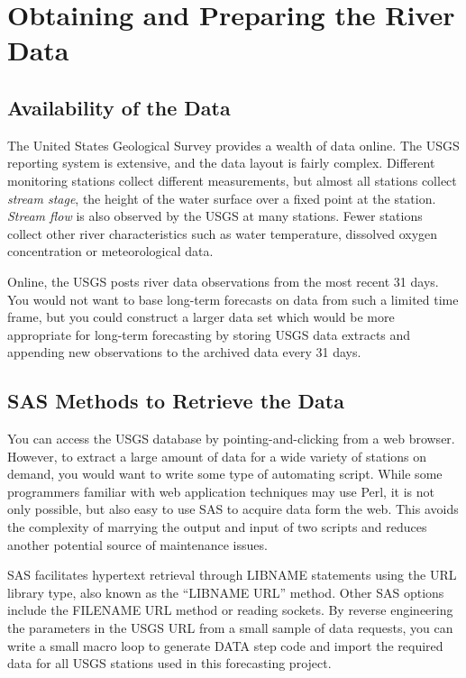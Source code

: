\documentclass[10pt]{sugconf-ish}
\begin{document}
\section{Obtaining and Preparing the River Data}


\subsection{Availability of the Data}
The United States Geological Survey provides a wealth of data online. The USGS reporting system is extensive, and the data layout is fairly complex. Different monitoring stations collect different measurements, but almost all stations collect \emph{stream stage}, the height of the water surface over a fixed point at the station. \emph{Stream flow} is also observed by the USGS at many stations. Fewer stations collect other river characteristics such as water temperature, dissolved oxygen concentration or meteorological data.

Online, the USGS posts river data observations from the most recent 31 days. You would not want to base long-term forecasts on data from such a limited time frame, but you could construct a larger data set which would be more appropriate for long-term forecasting by storing USGS data extracts and appending new observations to the archived data every 31 days.


\subsection{SAS Methods to Retrieve the Data}
You can access the USGS database by pointing-and-clicking from a web browser. However, to extract a large amount of data for a wide variety of stations on demand, you would want to write some type of automating script. While some programmers familiar with web application techniques may use Perl, it is not only possible, but also easy to use SAS to acquire data form the web. This avoids the complexity of marrying the output and input of two scripts and reduces another potential source of maintenance issues.

SAS facilitates hypertext retrieval through LIBNAME statements using the URL library type, also known as the ``LIBNAME URL'' method. Other SAS options include the FILENAME URL method or reading sockets. By reverse engineering the parameters in the USGS URL from a small sample of data requests, you can write a small macro loop to generate DATA step code and import the required data for all USGS stations used in this forecasting project.
\end{document}
